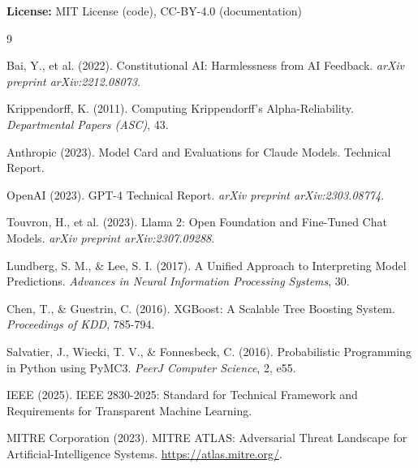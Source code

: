 \documentclass[11pt,a4paper]{article}
\begin{document}
\textbf{License:} MIT License (code), CC-BY-4.0 (documentation)


\begin{thebibliography}{9}

Bai, Y., et al. (2022).
\newblock Constitutional AI: Harmlessness from AI Feedback.
\newblock \textit{arXiv preprint arXiv:2212.08073}.

Krippendorff, K. (2011).
\newblock Computing Krippendorff's Alpha-Reliability.
\newblock \textit{Departmental Papers (ASC)}, 43.

Anthropic (2023).
\newblock Model Card and Evaluations for Claude Models.
\newblock Technical Report.

OpenAI (2023).
\newblock GPT-4 Technical Report.
\newblock \textit{arXiv preprint arXiv:2303.08774}.

Touvron, H., et al. (2023).
\newblock Llama 2: Open Foundation and Fine-Tuned Chat Models.
\newblock \textit{arXiv preprint arXiv:2307.09288}.

Lundberg, S. M., \& Lee, S. I. (2017).
\newblock A Unified Approach to Interpreting Model Predictions.
\newblock \textit{Advances in Neural Information Processing Systems}, 30.

Chen, T., \& Guestrin, C. (2016).
\newblock XGBoost: A Scalable Tree Boosting System.
\newblock \textit{Proceedings of KDD}, 785-794.

Salvatier, J., Wiecki, T. V., \& Fonnesbeck, C. (2016).
\newblock Probabilistic Programming in Python using PyMC3.
\newblock \textit{PeerJ Computer Science}, 2, e55.

IEEE (2025).
\newblock IEEE 2830-2025: Standard for Technical Framework and Requirements for Transparent Machine Learning.

MITRE Corporation (2023).
\newblock MITRE ATLAS: Adversarial Threat Landscape for Artificial-Intelligence Systems.
\newblock \url{https://atlas.mitre.org/}.

\end{thebibliography}
\end{document}
